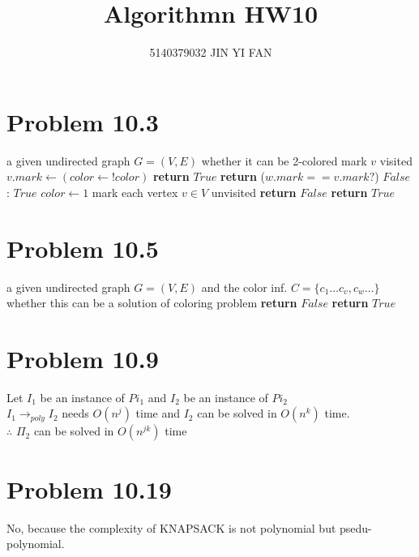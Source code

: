 \documentclass[a4paper]{article}
\title{\textbf{Algorithmn HW10}}
\author{5140379032 JIN YI FAN}
\date{}
\begin{document}
\maketitle
\begin{spacing}{1.3}
\section*{Problem 10.3}
\begin{algorithmic}[1]
\Require a given undirected graph $G=(V,E)$
\Ensure whether it can be 2-colored
\State mark $v$ visited
\State $v.mark\gets (color\gets !color)$
\State {}
\State \textbf{return} $True$
\Else \State \textbf{return} ($w.mark==v.mark?$) $False$ : $True$
\EndIf
\EndFor
\EndFunction
\State $color\gets 1$
\State mark each vertex $v\in V$ unvisited
\State \textbf{return} $False$
\EndIf
\EndFor
\State \textbf{return} $True$
\end{algorithmic}

\section*{Problem 10.5}
\begin{algorithmic}[1]
\Require a given undirected graph $G=(V,E)$ and the color inf. $C=\{ c_1\ldots c_v, c_w\ldots\}$
\Ensure whether this can be a solution of coloring problem 
\State \textbf{return} $False$
\EndIf
\EndFor
\State \textbf{return} $True$
\end{algorithmic}

\section*{Problem 10.9}
Let $I_1$ be an instance of $Pi_1$ and $I_2$ be an instance of $Pi_2$
\\$I_1\rightarrow_{poly} I_2$ needs $O(n^j)$ time and $I_2$ can be solved in $O(n^k)$ time.
\\$\therefore$ $\Pi_2$ can be solved in $O(n^{jk})$ time

\section*{Problem 10.19}
No, because the complexity of KNAPSACK is not polynomial but psedu-polynomial.


\end{spacing}
\end{document}

